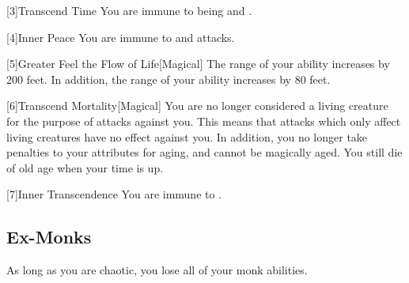         [3]{Transcend Time} You are immune to being  and .

        [4]{Inner Peace} You are immune to  and  attacks.

        [5]{Greater Feel the Flow of Life}[Magical]
        The range of your  ability increases by 200 feet.
        In addition, the range of your  ability increases by 80 feet.

        [6]{Transcend Mortality}[Magical]
        You are no longer considered a living creature for the purpose of attacks against you.
        This means that attacks which only affect living creatures have no effect against you.
        In addition, you no longer take penalties to your attributes for aging, and cannot be magically aged.
        You still die of old age when your time is up.

        [7]{Inner Transcendence} You are immune to .



    \subsection{Ex-Monks}
        As long as you are chaotic, you lose all of your  monk abilities.

\newpage
